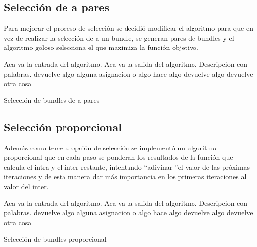 \subsection{Selección de a pares}
Para mejorar el proceso de selección se decidió modificar el algoritmo para que en vez de realizar 
la selección de a un bundle, se generan pares de bundles y el algoritmo goloso selecciona el que 
maximiza la función objetivo.
\begin{algorithm}[H]
\begin{algorithmic}[1]
\REQUIRE Aca va la entrada del algoritmo.
\ENSURE Aca va la salida del algoritmo.
\STATE Descripcion con palabras.
 \label{lin:marcacionLinea}
\RETURN devuelve algo
\ELSE
\STATE alguna asignacion o algo
\ENDIF
\ENDWHILE
{}
\STATE hace algo
\RETURN devuelve algo
\ENDIF
\ENDFOR
\RETURN devuelve otra cosa
\end{algorithmic}
\caption{Selección de bundles de a pares}\label{alg:algSelTuple}
\end{algorithm}
\subsection{Selección proporcional}
Además como tercera opción de selección se implementó un algoritmo proporcional que en cada paso se 
ponderan los resultados de la función que calcula el intra y el inter restante, intentando 
\textquotedblleft adivinar \textquotedblright el valor de las próximas iteraciones y de esta manera 
dar más importancia en los primeras iteraciones al valor del inter.
\begin{algorithm}[H]
\begin{algorithmic}[1]
\REQUIRE Aca va la entrada del algoritmo.
\ENSURE Aca va la salida del algoritmo.
\STATE Descripcion con palabras.
\RETURN devuelve algo
\ELSE
\STATE alguna asignacion o algo
\ENDIF
\ENDWHILE
{}
\STATE hace algo
\RETURN devuelve algo
\ENDIF
\ENDFOR
\RETURN devuelve otra cosa
\end{algorithmic}
\caption{Selección de bundles proporcional}\label{alg:algSelProp}
\end{algorithm}

